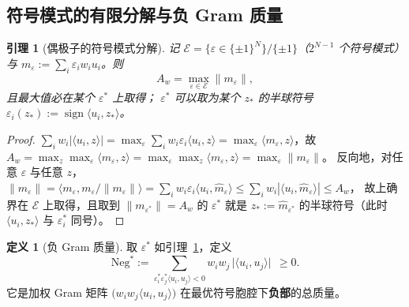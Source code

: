 \documentclass[UTF8,11pt]{ctexart}
\newtheorem{lemma}[theorem]{引理}
\theoremstyle{definition}
\newtheorem{definition}[theorem]{定义}
\begin{document}
\subsection{符号模式的有限分解与负 Gram 质量}\label{sec:r26:neg}

\begin{lemma}[偶极子的符号模式分解]\label{lem:r26sign}
记 $\mathcal{E}=\{\varepsilon\in\{\pm1\}^N\}/\{\pm1\}$（$2^{N-1}$ 个符号模式）与
$m_\varepsilon:=\sum_i\varepsilon_iw_iu_i$。则
\begin{equation}\label{eq:r26sign}
A_w=\max_{\varepsilon\in\mathcal{E}}\|m_\varepsilon\| ,
\end{equation}
且最大值必在某个 $\varepsilon^*$ 上取得；
$\varepsilon^*$ 可以取为某个 $z_*$ 的\emph{半球符号}
$\varepsilon_i(z_*):=\operatorname{sign}\langle u_i,z_*\rangle$。
\end{lemma}

\begin{proof}
$\sum_iw_i|\langle u_i,z\rangle|=\max_\varepsilon\sum_iw_i\varepsilon_i\langle u_i,z\rangle
=\max_\varepsilon\langle m_\varepsilon,z\rangle$，故
$A_w=\max_z\max_\varepsilon\langle m_\varepsilon,z\rangle
=\max_\varepsilon\max_z\langle m_\varepsilon,z\rangle=\max_\varepsilon\|m_\varepsilon\|$。
反向地，对任意 $\varepsilon$ 与任意 $z$，
$\|m_\varepsilon\|=\langle m_\varepsilon,m_\varepsilon/\|m_\varepsilon\|\rangle
=\sum_iw_i\varepsilon_i\langle u_i,\hat m_\varepsilon\rangle
\le\sum_iw_i|\langle u_i,\hat m_\varepsilon\rangle|\le A_w$，
故上确界在 $\mathcal{E}$ 上取得，且取到 $\|m_{\varepsilon^*}\|=A_w$ 的 $\varepsilon^*$
就是 $z_*:=\hat m_{\varepsilon^*}$ 的半球符号（此时 $\langle u_i,z_*\rangle$ 与 $\varepsilon_i^*$ 同号）。
\end{proof}

\begin{definition}[负 Gram 质量]\label{def:r26neg}
取 $\varepsilon^*$ 如引理~\ref{lem:r26sign}，定义
\begin{equation}\label{eq:r26negdef}
\mathrm{Neg}^*:=\sum_{\varepsilon_i^*\varepsilon_j^*\langle u_i,u_j\rangle<0}
w_iw_j\,\bigl|\langle u_i,u_j\rangle\bigr|\ \ \ge0 .
\end{equation}
它是加权 Gram 矩阵 $\bigl(w_iw_j\langle u_i,u_j\rangle\bigr)$
在最优符号胞腔下\textbf{负部}的总质量。
\end{definition}
\end{document}
